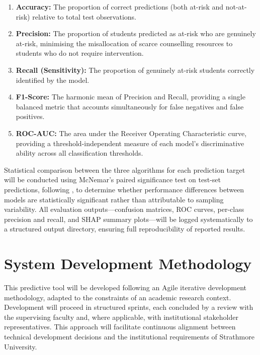 \documentclass[12pt]{report}
\begin{document}
\begin{enumerate}   
 
        \item \textbf{Accuracy:} The proportion of correct predictions (both at-risk
        and not-at-risk) relative to total test observations.

        \item \textbf{Precision:} The proportion of students predicted as at-risk
        who are genuinely at-risk, minimising the misallocation of scarce
        counselling resources to students who do not require intervention.

        \item \textbf{Recall (Sensitivity):} The proportion of genuinely at-risk
        students correctly identified by the model. 

        \item \textbf{F1-Score:} The harmonic mean of Precision and Recall,
        providing a single balanced metric that accounts simultaneously for
        false negatives and false positives.

        \item \textbf{ROC-AUC:} The area under the Receiver Operating
        Characteristic curve, providing a threshold-independent measure of
        each model's discriminative ability across all classification thresholds.    
    
\end{enumerate}

Statistical comparison between the three algorithms for each prediction target
will be conducted using McNemar's paired significance test on test-set predictions,
following \parencite{bettahi2025}, to determine whether performance
differences between models are statistically significant rather than
attributable to sampling variability. All evaluation outputs---confusion
matrices, ROC curves, per-class precision and recall, and SHAP summary
plots---will be logged systematically to a structured output directory, ensuring
full reproducibility of reported results.

\section{System Development Methodology}

This predictive tool will be developed following an Agile iterative development methodology,
adapted to the constraints of an academic research context. Development will proceed
in structured sprints, each concluded by a review with the supervising faculty and,
where applicable, with institutional stakeholder representatives. This approach will
facilitate continuous alignment between technical development decisions and the
institutional requirements of Strathmore University.
\end{document}
